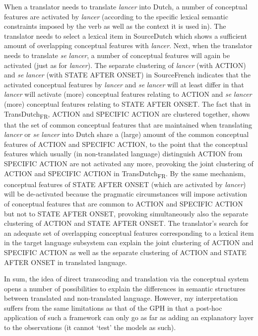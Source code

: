 When a translator needs to translate \textit{lancer} into Dutch, a number of conceptual features are activated by \textit{lancer} (according to the specific lexical semantic constraints imposed by the verb as well as the context it is used in). The translator needs to select a lexical item in SourceDutch which shows a sufficient amount of overlapping conceptual features with \textit{lancer}. Next, when the translator needs to translate \textit{se} \textit{lancer}, a number of conceptual features will again be activated (just as for \textit{lancer}). The separate clustering of \textit{lancer} (with ACTION) and \textit{se} \textit{lancer} (with STATE AFTER ONSET) in SourceFrench indicates that the activated conceptual features by \textit{lancer} and \textit{se} \textit{lancer} will at least differ in that \textit{lancer} will activate (more) conceptual features relating to ACTION and \textit{se} \textit{lancer} (more) conceptual features relating to STATE AFTER ONSET. The fact that in TransDutch\textsubscript{FR}, ACTION and SPECIFIC ACTION are clustered together, shows that the set of common conceptual features that are maintained when translating \textit{lancer} or \textit{se} \textit{lancer} into Dutch share a (large) amount of the common conceptual features of ACTION and SPECIFIC ACTION, to the point that the conceptual features which usually (in non-translated language) distinguish ACTION from SPECIFIC ACTION are not activated any more, provoking the joint clustering of ACTION and SPECIFIC ACTION in TransDutch\textsubscript{FR}. By the same mechanism, conceptual features of STATE AFTER ONSET (which are activated by \textit{lancer}) will be de-activated because the pragmatic circumstances will impose activation of conceptual features that are common to ACTION and SPECIFIC ACTION but not to STATE AFTER ONSET, provoking simultaneously also the separate clustering of ACTION and STATE AFTER ONSET. The translator’s search for an adequate set of overlapping conceptual features corresponding to a lexical item in the target language subsystem can explain the joint clustering of ACTION and SPECIFIC ACTION as well as the separate clustering of ACTION and STATE AFTER ONSET in translated language.

In sum, the idea of direct transcoding and translation via the conceptual system opens a number of possibilities to explain the differences in semantic structures between translated and non-translated language. However, my interpretation suffers from the same limitations as that of the GPH in that a post-hoc application of such a framework can only go as far as adding an explanatory layer to the observations (it cannot ‘test’ the models as such).

